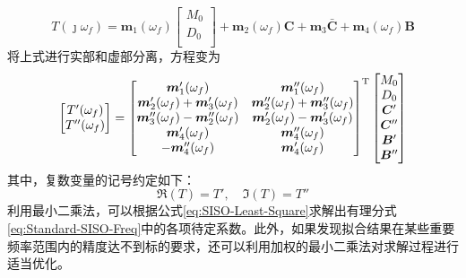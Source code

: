 \begin{equation}
  T(\jmath \omega_f)=\boldsymbol{m}_1(\omega_f)\left[
    \begin{matrix}
      M_0 \\
      D_0 \\
    \end{matrix} \right] + \boldsymbol{m}_2(\omega_f)\boldsymbol{C} + \boldsymbol{m}_3\boldsymbol{\bar{C}} +\boldsymbol{m}_4(\omega_f)\boldsymbol{B}
\end{equation}
将上式进行实部和虚部分离，方程变为
\begin{equation}
  \label{eq:SISO-Least-Square}
  \left[ \begin{matrix}
      T'(\omega_f)  \\
      T''(\omega_f) \\
    \end{matrix} \right]=\left[ \begin{matrix}
      \boldsymbol{m}'_1(\omega_f)                                & \boldsymbol{m}''_1(\omega_f)                               \\
      \boldsymbol{m}'_2(\omega_f)+ \boldsymbol{m}'_3(\omega_f)   & \boldsymbol{m}''_2(\omega_f)+ \boldsymbol{m}''_3(\omega_f) \\
      \boldsymbol{m}''_3(\omega_f)- \boldsymbol{m}''_2(\omega_f) & \boldsymbol{m}'_2(\omega_f)-\boldsymbol{m}'_3(\omega_f)    \\
      \boldsymbol{m}'_4(\omega_f)                                & \boldsymbol{m}''_4(\omega_f)                               \\
      -\boldsymbol{m}''_4(\omega_f)                              & \boldsymbol{m}'_4(\omega_f)
    \end{matrix} \right]^{\mathrm{T}} \left[ \begin{matrix}
      M_0              \\
      D_0              \\
      \boldsymbol{C}'  \\
      \boldsymbol{C}'' \\
      \boldsymbol{B}'  \\
      \boldsymbol{B}'' \\
    \end{matrix} \right]
\end{equation}
其中，复数变量的记号约定如下：
\begin{equation}
  \Re(T)=T',\quad\Im(T)=T''
\end{equation}
利用最小二乘法\cite{Bjorck:1996}，可以根据公式\eqref{eq:SISO-Least-Square}求解出有理分式\eqref{eq:Standard-SISO-Freq}中的各项待定系数。此外，如果发现拟合结果在某些重要频率范围内的精度达不到标的要求，还可以利用加权的最小二乘法\cite{Strutz:2011}对求解过程进行适当优化。

